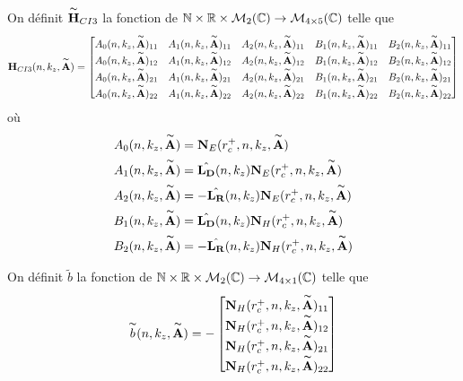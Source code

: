     \begin{defn}
      On définit \(\overset{\thicksim}{\mathbf{H}}_{CI3}\) la fonction de \(\mathbb N \times \mathbb R \times \mathcal{M}_2(\mathbb C) \rightarrow \mathcal{M}_{4\times5}(\mathbb C)\) telle que
      \begin{equation*}
        \mathbf{H}_{CI3}(n,k_z,\overset{\thicksim}{\mathbf{A}}) = 
        \begin{bmatrix}
          A_0(n,k_z,\overset{\thicksim}{\mathbf{A}})_{11} & A_1(n,k_z,\overset{\thicksim}{\mathbf{A}})_{11} & A_2(n,k_z,\overset{\thicksim}{\mathbf{A}})_{11} & B_1(n,k_z,\overset{\thicksim}{\mathbf{A}})_{11} & B_2(n,k_z,\overset{\thicksim}{\mathbf{A}})_{11}
          \\
          A_0(n,k_z,\overset{\thicksim}{\mathbf{A}})_{12} & A_1(n,k_z,\overset{\thicksim}{\mathbf{A}})_{12} & A_2(n,k_z,\overset{\thicksim}{\mathbf{A}})_{12} & B_1(n,k_z,\overset{\thicksim}{\mathbf{A}})_{12} & B_2(n,k_z,\overset{\thicksim}{\mathbf{A}})_{12}
          \\
          A_0(n,k_z,\overset{\thicksim}{\mathbf{A}})_{21} & A_1(n,k_z,\overset{\thicksim}{\mathbf{A}})_{21} & A_2(n,k_z,\overset{\thicksim}{\mathbf{A}})_{21} & B_1(n,k_z,\overset{\thicksim}{\mathbf{A}})_{21} & B_2(n,k_z,\overset{\thicksim}{\mathbf{A}})_{21}
          \\
          A_0(n,k_z,\overset{\thicksim}{\mathbf{A}})_{22} & A_1(n,k_z,\overset{\thicksim}{\mathbf{A}})_{22} & A_2(n,k_z,\overset{\thicksim}{\mathbf{A}})_{22} & B_1(n,k_z,\overset{\thicksim}{\mathbf{A}})_{22} & B_2(n,k_z,\overset{\thicksim}{\mathbf{A}})_{22}
        \end{bmatrix}
        \end{equation*}
        où
        \begin{align*}
          A_0(n,k_z,\overset{\thicksim}{\mathbf{A}}) &= \mathbf{N}_E(r_c^+,n,k_z,\overset{\thicksim}{\mathbf{A}})
          \\
          A_1(n,k_z,\overset{\thicksim}{\mathbf{A}}) &= \hat{\mathbf{L_D}}(n,k_z)\mathbf{N}_E(r_c^+,n,k_z,\overset{\thicksim}{\mathbf{A}})
          \\
          A_2(n,k_z,\overset{\thicksim}{\mathbf{A}}) &= -\hat{\mathbf{L_R}}(n,k_z)\mathbf{N}_E(r_c^+,n,k_z,\overset{\thicksim}{\mathbf{A}})
          \\
          B_1(n,k_z,\overset{\thicksim}{\mathbf{A}}) &= \hat{\mathbf{L_D}}(n,k_z)\mathbf{N}_H(r_c^+,n,k_z,\overset{\thicksim}{\mathbf{A}})
          \\
          B_2(n,k_z,\overset{\thicksim}{\mathbf{A}}) &= -\hat{\mathbf{L_R}}(n,k_z)\mathbf{N}_H(r_c^+,n,k_z,\overset{\thicksim}{\mathbf{A}})            
        \end{align*}

        On définit \(\tilde{b}\) la fonction de \(\mathbb N \times \mathbb R \times \mathcal{M}_2(\mathbb C) \rightarrow \mathcal{M}_{4\times1}(\mathbb C)\) telle que
        \begin{equation*}
          \overset{\thicksim}{b}(n,k_z,\overset{\thicksim}{\mathbf{A}}) = -
          \begin{bmatrix}
            \mathbf{N}_H(r_c^+,n,k_z,\overset{\thicksim}{\mathbf{A}})_{11}
            \\
            \mathbf{N}_H(r_c^+,n,k_z,\overset{\thicksim}{\mathbf{A}})_{12}
            \\
            \mathbf{N}_H(r_c^+,n,k_z,\overset{\thicksim}{\mathbf{A}})_{21}
            \\
            \mathbf{N}_H(r_c^+,n,k_z,\overset{\thicksim}{\mathbf{A}})_{22}
          \end{bmatrix}
        \end{equation*}
      \end{defn}


